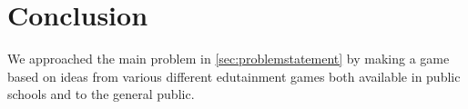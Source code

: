 \section{Conclusion}
\label{sec:report_conclusion}



We approached the main problem in \autoref{sec:problemstatement} by making a game based on ideas from various different edutainment games both available in public schools and to the general public.\\






